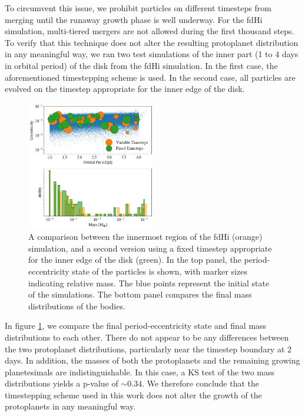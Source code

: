 \documentclass[twocolumn,linenumbers]{aastex63}
\begin{document}
To circumvent this issue, we prohibit particles on different timesteps from merging until the runaway growth phase is well underway. For the fdHi simulation, multi-tiered mergers are not allowed during the first thousand steps. To verify that this technique does not alter the resulting protoplanet distribution in any meaningful way, we ran two test simulations of the inner part (1 to 4 days in orbital period) of the disk from the fdHi simulation. In the first case, the aforementioned timestepping scheme is used. In the second case, all particles are evolved on the timestep appropriate for the inner edge of the disk.

\begin{figure}
\begin{center}
    \includegraphics[width=0.5\textwidth]{figures/rung_ecc.png}
    \caption{A comparison between the innermost region of the fdHi (orange) simulation, and a second version using a fixed timestep appropriate for the inner edge of the disk (green). In the top panel, the period-eccentricity state of the particles is shown, with marker sizes indicating relative mass. The blue points represent the initial state of the simulations. The bottom panel compares the final mass distributions of the bodies.\label{fig:rung_ecc}}
\end{center}
\end{figure}

In figure \ref{fig:rung_ecc}, we compare the final period-eccentricity state and final mass distributions to each other. There do not appear to be any differences between the two protoplanet distributions, particularly near the timestep boundary at 2 days. In addition, the masses of both the protoplanets and the remaining growing planetesimals are indistinguishable. In this case, a KS test of the two mass distributions yields a p-value of $\sim 0.34$. We therefore conclude that the timestepping scheme used in this work does not alter the growth of the protoplanets in any meaningful way.



\clearpage
\end{document}
